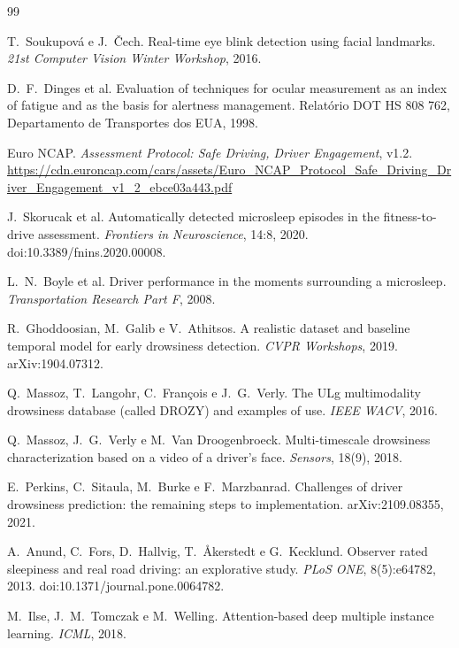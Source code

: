 \documentclass[11pt,a4paper]{article}
\begin{document}
\begin{thebibliography}{99}
\small
\setlength{\itemsep}{2pt}

 T.~Soukupová e J.~Čech. Real-time eye blink detection using facial landmarks. \emph{21st Computer Vision Winter Workshop}, 2016.

 D.~F.~Dinges et al. Evaluation of techniques for ocular measurement as an index of fatigue and as the basis for alertness management. Relatório DOT HS 808 762, Departamento de Transportes dos EUA, 1998.

 Euro NCAP. \emph{Assessment Protocol: Safe Driving, Driver Engagement}, v1.2. \url{https://cdn.euroncap.com/cars/assets/Euro_NCAP_Protocol_Safe_Driving_Driver_Engagement_v1_2_ebce03a443.pdf}

 J.~Skorucak et al. Automatically detected microsleep episodes in the fitness-to-drive assessment. \emph{Frontiers in Neuroscience}, 14:8, 2020. doi:10.3389/fnins.2020.00008.

 L.~N.~Boyle et al. Driver performance in the moments surrounding a microsleep. \emph{Transportation Research Part F}, 2008.

 R.~Ghoddoosian, M.~Galib e V.~Athitsos. A realistic dataset and baseline temporal model for early drowsiness detection. \emph{CVPR Workshops}, 2019. arXiv:1904.07312.

 Q.~Massoz, T.~Langohr, C.~François e J.~G.~Verly. The ULg multimodality drowsiness database (called DROZY) and examples of use. \emph{IEEE WACV}, 2016.

 Q.~Massoz, J.~G.~Verly e M.~Van Droogenbroeck. Multi-timescale drowsiness characterization based on a video of a driver's face. \emph{Sensors}, 18(9), 2018.

 E.~Perkins, C.~Sitaula, M.~Burke e F.~Marzbanrad. Challenges of driver drowsiness prediction: the remaining steps to implementation. arXiv:2109.08355, 2021.

 A.~Anund, C.~Fors, D.~Hallvig, T.~Åkerstedt e G.~Kecklund. Observer rated sleepiness and real road driving: an explorative study. \emph{PLoS ONE}, 8(5):e64782, 2013. doi:10.1371/journal.pone.0064782.

 M.~Ilse, J.~M.~Tomczak e M.~Welling. Attention-based deep multiple instance learning. \emph{ICML}, 2018.


\end{thebibliography}
\end{document}
